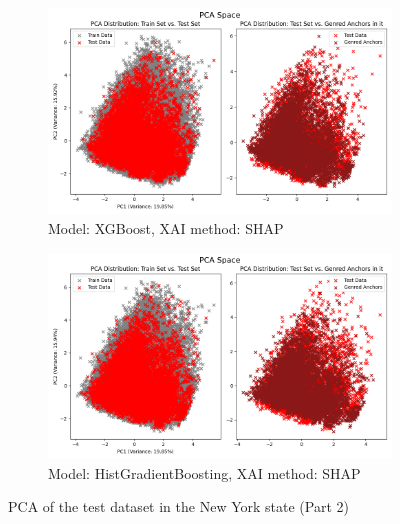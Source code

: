 \begin{figure}[h]
    \ContinuedFloat
    \begin{subfigure}[b]{0.9\textwidth}
        \includegraphics[width=\textwidth]{Images/pca/pca_xg_ny_shap.png}
        \caption{Model: XGBoost, XAI method: SHAP}
        \label{fig:pca_xg_ny_shap}
    \end{subfigure}
    \hfill
    \begin{subfigure}[b]{0.9\textwidth}
        \includegraphics[width=\textwidth]{Images/pca/pca_skrub_ny_shap.png}
        \caption{Model: HistGradientBoosting, XAI method: SHAP}
        \label{fig:pca_skrub_ny_shap}
    \end{subfigure}
    \caption{PCA of the test dataset in the New York state (Part 2)}
    \label{fig:pca_ny}
\end{figure}